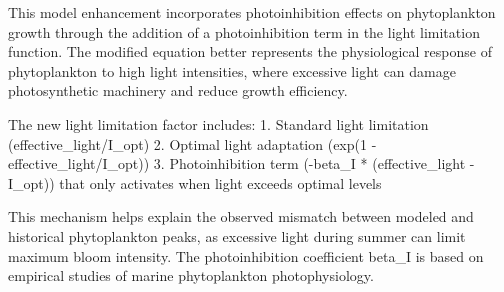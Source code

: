 This model enhancement incorporates photoinhibition effects on phytoplankton growth through the addition of a photoinhibition term in the light limitation function. The modified equation better represents the physiological response of phytoplankton to high light intensities, where excessive light can damage photosynthetic machinery and reduce growth efficiency.

The new light limitation factor includes:
1. Standard light limitation (effective_light/I_opt)
2. Optimal light adaptation (exp(1 - effective_light/I_opt))
3. Photoinhibition term (-beta_I * (effective_light - I_opt)) that only activates when light exceeds optimal levels

This mechanism helps explain the observed mismatch between modeled and historical phytoplankton peaks, as excessive light during summer can limit maximum bloom intensity. The photoinhibition coefficient beta_I is based on empirical studies of marine phytoplankton photophysiology.
